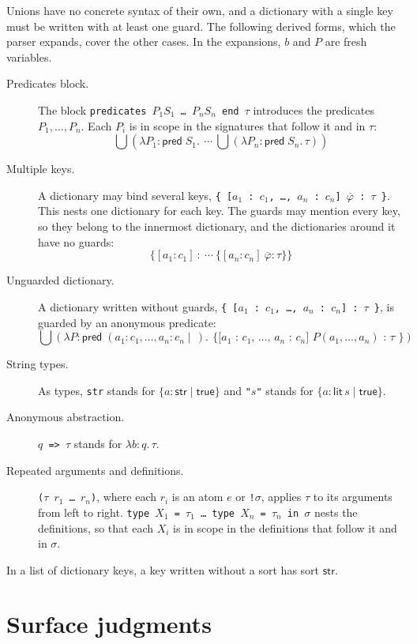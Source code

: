 \documentclass[11pt]{article}
\newcommand{\kw}[1]{\mathsf{#1}}
\newcommand{\str}{\kw{str}}
\newcommand{\lit}[1]{\kw{lit}\,#1}
\newcommand{\pred}[1]{\kw{pred}\;#1}
\newcommand{\true}{\kw{true}}
\newcommand{\gdict}[4]{\{[#1 : #2]\ #3 : #4\}}
\newcommand{\refine}[3]{\{#1 : #2 \mid #3\}}
\newcommand{\iabs}[3]{\lambda #1 : #2.\,#3}
\newcommand{\union}[1]{\textstyle\bigcup #1}
\newcommand{\code}[1]{\texttt{#1}}
\theoremstyle{remark}
\begin{document}
Unions have no concrete syntax of their own, and a dictionary with a single key must be written
with at least one guard. The following derived forms, which the parser expands, cover the other
cases. In the expansions, $b$ and $P$ are fresh variables.

\begin{description}
\item[Predicates block.] The block
  \code{predicates $P_1 S_1$ \ldots\ $P_n S_n$ end $\tau$} introduces the predicates
  $P_1, \ldots, P_n$. Each $P_i$ is in scope in the signatures that follow it and in $\tau$:
  \[ \union{(\iabs{P_1}{\pred{S_1}}{\ \cdots\ \union{(\iabs{P_n}{\pred{S_n}}{\tau})}})} \]
\item[Multiple keys.] A dictionary may bind several keys,
  \code{\{ [$a_1$ :\ $c_1$, \ldots, $a_n$ :\ $c_n$] $\overline{\varphi}$ :\ $\tau$ \}}. This nests
  one dictionary for each key. The guards may mention every key, so they belong to the innermost
  dictionary, and the dictionaries around it have no guards:
  \[ \gdict{a_1}{c_1}{}{\ \cdots\ \gdict{a_n}{c_n}{\overline{\varphi}}{\tau}} \]
\item[Unguarded dictionary.] A dictionary written without guards,
  \code{\{ [$a_1$ :\ $c_1$, \ldots, $a_n$ :\ $c_n$] :\ $\tau$ \}}, is guarded by an anonymous
  predicate:
  \[ \union{(\iabs{P}{\pred{(a_1 : c_1, \ldots, a_n : c_n \mid\,)}}{\
       \code{\{ [$a_1$ :\ $c_1$, \ldots, $a_n$ :\ $c_n$] $P(a_1, \ldots, a_n)$ :\ $\tau$ \}}})} \]
\item[String types.] As types, \code{str} stands for $\refine{a}{\str}{\true}$ and \code{"$s$"}
  stands for $\refine{a}{\lit{s}}{\true}$.
\item[Anonymous abstraction.] \code{$q$ => $\tau$} stands for $\iabs{b}{q}{\tau}$.
\item[Repeated arguments and definitions.]
  \code{($\tau$ $r_1$ \ldots\ $r_n$)}, where each $r_i$ is an atom $e$ or \code{!$\sigma$},
  applies $\tau$ to its arguments from left to right. \code{type $X_1$ = $\tau_1$ \ldots\ type $X_n$
  = $\tau_n$ in $\sigma$} nests the definitions, so that each $X_i$ is in scope in the definitions
  that follow it and in $\sigma$.
\end{description}

In a list of dictionary keys, a key written without a sort has sort $\str$.

\FloatBarrier
\section{Surface judgments}
\label{sec:surface-judgments}
\end{document}
